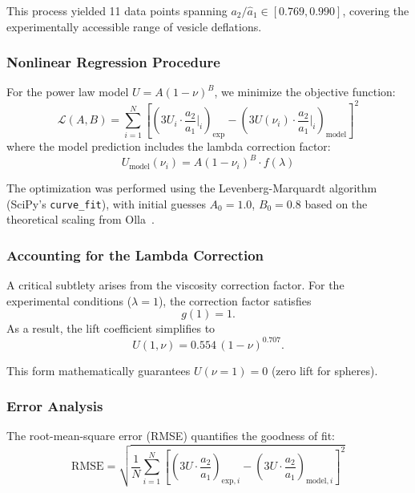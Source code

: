 \documentclass{article}
\begin{document}
This process yielded 11 data points spanning $a_2/\hat{a}_1 \in [0.769, 0.990]$, covering the experimentally accessible range of vesicle deflations.

\subsubsection{Nonlinear Regression Procedure}

For the power law model $U = A(1-\nu)^B$, we minimize the objective function:
\begin{equation}
    \mathcal{L}(A, B) = \sum_{i=1}^{N} \left[ \left(3 U_i \cdot \frac{a_2}{a_1}\bigg|_i\right)_{\text{exp}} - \left(3 U(\nu_i) \cdot \frac{a_2}{a_1}\bigg|_i\right)_{\text{model}} \right]^2
    \label{eq:objective}
\end{equation}
where the model prediction includes the lambda correction factor:
\begin{equation}
    U_{\text{model}}(\nu_i) = A(1-\nu_i)^B \cdot f(\lambda)
\end{equation}

The optimization was performed using the Levenberg-Marquardt algorithm (SciPy's \texttt{curve\_fit}), with initial guesses $A_0 = 1.0$, $B_0 = 0.8$ based on the theoretical scaling from Olla~\cite{olla1997}.

\subsubsection{Accounting for the Lambda Correction}

A critical subtlety arises from the viscosity correction factor. For the experimental conditions ($\lambda = 1$), the correction factor satisfies
\begin{equation}
    g(1) = 1 .
\end{equation}
As a result, the lift coefficient simplifies to
\begin{equation}
    U(1,\nu) = 0.554 \,(1-\nu)^{0.707}.
\end{equation}


This form mathematically guarantees $U(\nu=1) = 0$ (zero lift for spheres).

\subsubsection{Error Analysis}

The root-mean-square error (RMSE) quantifies the goodness of fit:
\begin{equation}
    \text{RMSE} = \sqrt{\frac{1}{N} \sum_{i=1}^{N} \left[ \left(3U \cdot \frac{a_2}{a_1}\right)_{\text{exp},i} - \left(3U \cdot \frac{a_2}{a_1}\right)_{\text{model},i} \right]^2}
\end{equation}
\end{document}
